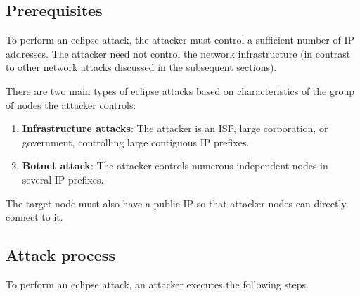 \documentclass[12pt]{article}
\begin{document}
\subsection{Prerequisites}

To perform an eclipse attack, the attacker must control a sufficient number of IP addresses. The attacker need not control the network infrastructure (in contrast to other network attacks discussed in the subsequent sections).

There are two main types of eclipse attacks based on characteristics of the group of nodes the attacker controls:

\begin{enumerate}
    \item \textbf{Infrastructure attacks}: The attacker is an ISP, large corporation, or government, controlling large contiguous IP prefixes.
    \item \textbf{Botnet attack}: The attacker controls numerous independent nodes in several IP prefixes.
\end{enumerate}

The target node must also have a public IP so that attacker nodes can directly connect to it.

\subsection{Attack process}

To perform an eclipse attack, an attacker executes the following steps.
\end{document}
